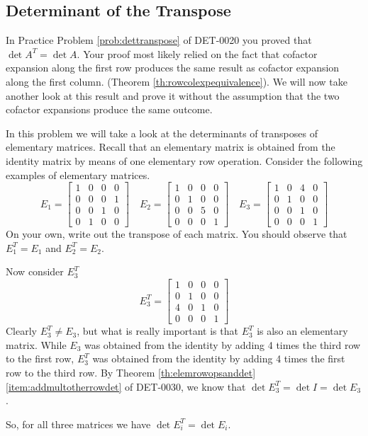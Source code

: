\documentclass{ximera}
\begin{document}
\subsection*{Determinant of the Transpose}
In Practice Problem \ref{prob:dettranspose} of DET-0020 you proved that $\det{A^T}=\det{A}$.  Your proof most likely relied on the fact that cofactor expansion along the first row produces the same result as cofactor expansion along the first column.  (Theorem \ref{th:rowcolexpequivalence}).  We will now take another look at this result and prove it without the assumption that the two cofactor expansions produce the same outcome.
\begin{exploration}\label{init:detoftranspose}
In this problem we will take a look at the determinants of transposes of elementary matrices.  Recall that an elementary matrix is obtained from the identity matrix by means of one elementary row operation.  Consider the following examples of elementary matrices.
$$E_1=\begin{bmatrix}1&0&0&0\\0&0&0&1\\0&0&1&0\\0&1&0&0\end{bmatrix}\quad E_2=\begin{bmatrix}1&0&0&0\\0&1&0&0\\0&0&5&0\\0&0&0&1\end{bmatrix}\quad E_3=\begin{bmatrix}1&0&4&0\\0&1&0&0\\0&0&1&0\\0&0&0&1\end{bmatrix}$$
On your own, write out the transpose of each matrix.  You should observe that $E_1^T=E_1$ and $E_2^T=E_2$.  

Now consider $E_3^T$
$$E_3^T=\begin{bmatrix}1&0&0&0\\0&1&0&0\\4&0&1&0\\0&0&0&1\end{bmatrix}$$
Clearly $E_3^T\neq E_3$, but what is really important is that $E_3^T$ is also an elementary matrix.  While $E_3$ was obtained from the identity by adding 4 times the third row to the first row, $E_3^T$ was obtained from the identity by adding 4 times the first row to the third row.  By Theorem \ref{th:elemrowopsanddet}\ref{item:addmultotherrowdet} of DET-0030, we know that $\det{E_3^T}=\det{I}=\det{E_3}$.

So, for all three matrices we have $\det{E_i^T}=\det{E_i}$.
\end{exploration}
\end{document}
